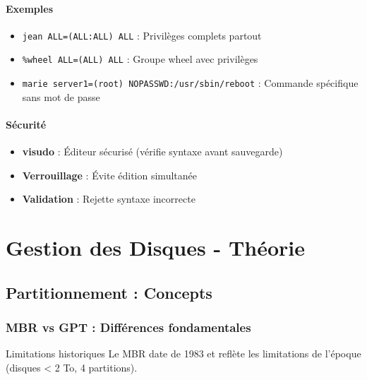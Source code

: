 \documentclass[12pt,a4paper]{article}
\begin{document}
\paragraph{Exemples}
\begin{itemize}
    \item \texttt{jean ALL=(ALL:ALL) ALL} : Privilèges complets partout
    \item \texttt{\%wheel ALL=(ALL) ALL} : Groupe wheel avec privilèges
    \item \texttt{marie server1=(root) NOPASSWD:/usr/sbin/reboot} : Commande spécifique sans mot de passe
\end{itemize}

\paragraph{Sécurité}
\begin{itemize}
    \item \textbf{visudo} : Éditeur sécurisé (vérifie syntaxe avant sauvegarde)
    \item \textbf{Verrouillage} : Évite édition simultanée
    \item \textbf{Validation} : Rejette syntaxe incorrecte
\end{itemize}


\section{Gestion des Disques - Théorie}

\subsection{Partitionnement : Concepts}

\subsubsection{MBR vs GPT : Différences fondamentales}

\begin{infobox}{Limitations historiques}
Le MBR date de 1983 et reflète les limitations de l'époque (disques < 2 To, 4 partitions).
\end{infobox}
\end{document}

